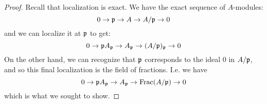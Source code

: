 \begin{proof}
	Recall that localization is exact. We have the exact sequence of $A$-modules:
	\[ 0 \to \mathfrak{p} \to A \to A/\mathfrak{p} \to 0 \]
	and we can localize it at $\mathfrak{p}$ to get:
	\[ 0 \to \mathfrak{p} A_{\mathfrak{p}} \to A_{\mathfrak{p}} \to (A/\mathfrak{p})_{\mathfrak{p}} \to 0 \]
	On the other hand, we can recognize that $\mathfrak{p}$ corresponds to the ideal 0 in $A/\mathfrak{p}$, and so this final localization is the field of fractions. I.e. we have
	\[ 0 \to \mathfrak{p} A_{\mathfrak{p}} \to A_{\mathfrak{p}} \to \operatorname{Frac}(A/\mathfrak{p}) \to 0 \]
	which is what we sought to show.
\end{proof}
